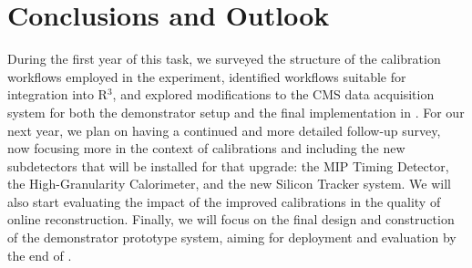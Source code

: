 \chapter{Conclusions and Outlook}

During the first year of this task, 
we surveyed the structure of the calibration workflows employed in the experiment, 
identified workflows suitable for integration into R$^3$, 
and explored modifications to the CMS data acquisition system for both the demonstrator setup and the final implementation in \Phasetwo.
For our next year, we plan on having a continued and more detailed follow-up survey, 
now focusing more in the context of \Phasetwo calibrations and including the new subdetectors that will be installed for that upgrade: 
the MIP Timing Detector,
the High-Granularity Calorimeter,
and the
new Silicon Tracker system.
We will also start evaluating the impact of the improved calibrations in the quality of online reconstruction.
Finally, we will focus on the final design and construction of the demonstrator prototype system, aiming for  deployment and evaluation by the end of \Runthree.